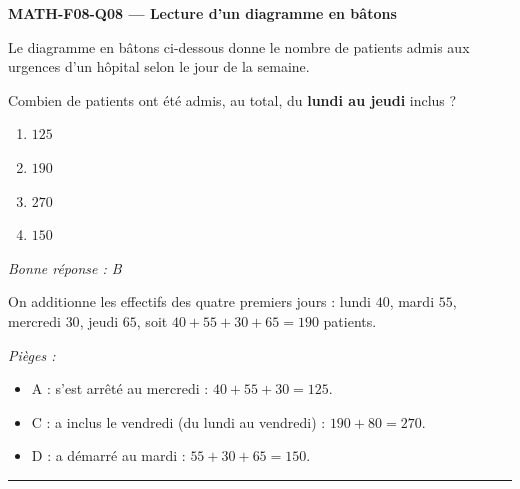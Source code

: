 \documentclass[11pt,a4paper]{article}
\begin{document}
\noindent\textbf{MATH-F08-Q08 --- Lecture d'un diagramme en bâtons}\par
Le diagramme en bâtons ci-dessous donne le nombre de patients admis aux urgences d'un hôpital selon le jour de la semaine.
\begin{center}
\end{center}
Combien de patients ont été admis, au total, du \textbf{lundi au jeudi} inclus ?
\begin{enumerate}[label=\Alph*)]
\item $125$
\item $190$
\item $270$
\item $150$
\end{enumerate}
\textit{Bonne réponse : B}\par
On additionne les effectifs des quatre premiers jours : lundi $40$, mardi $55$, mercredi $30$, jeudi $65$, soit $40+55+30+65=190$ patients.\par
\textit{Pièges :}
\begin{itemize}
\item A : s'est arrêté au mercredi : $40+55+30=125$.
\item C : a inclus le vendredi (du lundi au vendredi) : $190+80=270$.
\item D : a démarré au mardi : $55+30+65=150$.
\end{itemize}
\vspace{8pt}\hrule\vspace{8pt}
\end{document}
